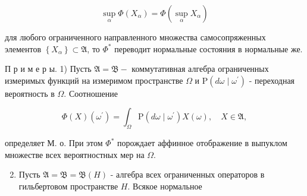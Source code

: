 \documentclass[10pt]{article}
\begin{document}
\[

\sup _{\alpha} \Phi\left(X_{\alpha}\right)=\Phi\left(\sup _{\alpha} X_{\alpha}\right)

\]



для любого ограниченного направленного множества самосопряженных элементов $\left\{X_{\alpha}\right\} \subset \mathfrak{A}$, то $\Phi^{*}$ переводит нормальные состояния в нормальные же.



П р и м е р ы. 1) Пусть $\mathfrak{A}=\mathfrak{B}-$ коммутативная алгебра ограниченных измеримых функций на измеримом пространстве $\Omega$ и $\mathrm{P}\left(d \omega \mid \omega^{\prime}\right)$ - переходная вероятность в $\Omega$. Соотношение



\[

\Phi(X)\left(\omega^{\prime}\right)=\int_{\Omega} \mathrm{P}\left(d \omega \mid \omega^{\prime}\right) X(\omega), \quad X \in \mathfrak{A},

\]



определяет М. о. При этом $\Phi^{*}$ порождает аффинное отображение в выпуклом множестве всех вероятностных мер на $\Omega$.



\begin{enumerate}

  \setcounter{enumi}{1}

  \item Пусть $\mathfrak{A}=\mathfrak{B}=\mathfrak{B}(H)$ - алгебра всех ограниченных операторов в гильбертовом пространстве $H$. Всякое нормальное

\end{enumerate}
\end{document}
